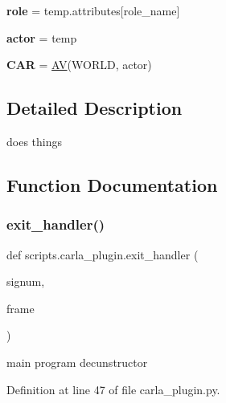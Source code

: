 \begin{DoxyCompactItemize}
\item 
\mbox{\label{namespacescripts_1_1carla__plugin_a335bd26f483bc8e44d752a779e37c559}} 
{\bfseries role} = temp.\+attributes\mbox{[}\textquotesingle{}role\+\_\+name\textquotesingle{}\mbox{]}
\item 
\mbox{\label{namespacescripts_1_1carla__plugin_a8a4b15393a7ce4a930796ca5a586773f}} 
{\bfseries actor} = temp
\item 
\mbox{\label{namespacescripts_1_1carla__plugin_a1afcfa9fddc4629072d0abc8511637c7}} 
{\bfseries C\+AR} = \hyperlink{classscripts_1_1osu__modules_1_1dynamics_1_1av_1_1AV}{AV}(W\+O\+R\+LD, actor)
\end{DoxyCompactItemize}


\subsection{Detailed Description}
does things 

\subsection{Function Documentation}
\mbox{\label{namespacescripts_1_1carla__plugin_a779dc6d947f91025ecee9c1a340c98de}} 
\subsubsection{\texorpdfstring{exit\+\_\+handler()}{exit\_handler()}}
{\footnotesize\ttfamily def scripts.\+carla\+\_\+plugin.\+exit\+\_\+handler (\begin{DoxyParamCaption}\item[{}]{signum,  }\item[{}]{frame }\end{DoxyParamCaption})}

\begin{DoxyVerb}main program decunstructor \end{DoxyVerb}
 

Definition at line 47 of file carla\+\_\+plugin.\+py.


